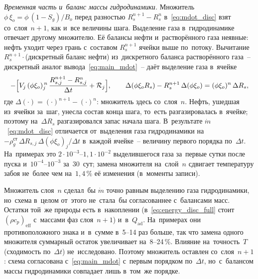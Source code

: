 \documentclass[12pt,a4paper]{article}
\newcommand{\xio}{\xi_o}
\newcommand{\mdot}{\dot{m}}
\newcommand{\rhocpeff}{(\rho c_p)_{\mathrm{eff}}}
\newcommand{\Qad}{Q_{\mathrm{ad}}}
\begin{document}
\emph{Временная часть и~баланс массы гидродинамики.}
Множитель $\phi\,\xio = \phi\,(1-S_g)/B_o$ перед разностью
$R_s^{n+1} - R_s^n$ в~\eqref{eq:mdot_disc} взят со~слоя~$n+1$, как
и~все величины шага. Выделение газа в~гидродинамике отвечает другому
множителю. Её балансы нефти и~растворённого газа неявные: нефть уходит
через грань с~составом $R_s^{n+1}$ ячейки выше по~потоку. Вычитание
$R_s^{n+1}\cdot$(дискретный баланс нефти) из~дискретного баланса
растворённого газа~-- дискретный аналог вывода~\eqref{eq:main_mdot}~--
даёт выделение газа в~ячейке
\[
  -\Bigl[V_j\,(\phi\xio)_j^{\,n}\,
    \frac{R_{s,j}^{n+1} - R_{s,j}^n}{\Delta t} + \mathcal{R}_j\Bigr],
  \qquad
  \Delta(\phi\xio R_s) - R_s^{n+1}\,\Delta(\phi\xio)
  = (\phi\xio)^n\,\Delta R_s,
\]
где $\Delta(\cdot) = (\cdot)^{n+1} - (\cdot)^n$: множитель здесь
со~слоя~$n$. Нефть, ушедшая из~ячейки за~шаг, унесла состав конца
шага, то~есть разгазировалась в~ячейке; поэтому на~$\Delta R_s$
разгазировался запас начала шага. В~результате
$\mdot$~\eqref{eq:mdot_disc} отличается от~выделения газа
гидродинамики на~$-\rho_g^{\text{ст}}\,\Delta R_{s,j}\,
\Delta(\phi\xio)_j/\Delta t$ в~каждой ячейке~-- величину первого
порядка по~$\Delta t$. На~примерах это $2\cdot10^{-3}$--$1{,}1\cdot10^{-2}$
выделившегося газа за~первые сутки после пуска
и~$10^{-4}$--$10^{-3}$ за~30~сут; замена множителя на~слой~$n$
сдвигает температуру забоя не~более чем на~$1{,}4\,\%$ её изменения
(в~моменты записи).

Множитель слоя~$n$ сделал~бы $\mdot$ точно равным выделению газа
гидродинамики, но~схема в~целом от~этого не~стала~бы согласованнее
с~балансами масс. Остатки той~же природы есть в~накоплении
(в~\eqref{eq:energy_disc_full} стоит $\rhocpeff$ с~массами фаз
слоя~$n+1$) и~в~$\Qad$. На~примерах они противоположного знака
и~в~сумме в~5--14 раз больше, так что замена одного множителя
суммарный остаток увеличивает на~8--24\,\%. Влияние на~точность~$T$
(сходимость по~$\Delta t$) не~исследовано. Поэтому множитель оставлен
со~слоя~$n+1$: схема согласована с~\eqref{eq:main_mdot} с~первым
порядком по~$\Delta t$, но~с~балансом массы гидродинамики совпадает
лишь в~том~же порядке.
\end{document}
